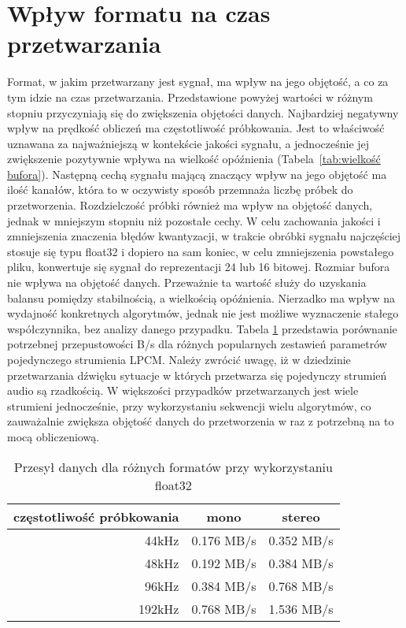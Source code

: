 \section{Wpływ formatu na czas przetwarzania}
Format, w jakim przetwarzany jest sygnał, ma wpływ na jego objętość, a co za tym idzie na czas przetwarzania. Przedstawione powyżej wartości w różnym stopniu przyczyniają się do zwiększenia objętości danych. Najbardziej negatywny wpływ na prędkość obliczeń ma częstotliwość próbkowania. Jest to właściwość uznawana za najważniejszą w kontekście jakości sygnału, a jednocześnie jej zwiększenie pozytywnie wpływa na wielkość opóźnienia (Tabela~\ref{tab:wielkość bufora}). Następną cechą sygnału mającą znaczący wpływ na jego objętość ma ilość kanałów, która to w oczywisty sposób przemnaża liczbę próbek do przetworzenia. Rozdzielczość próbki również ma wpływ na objętość danych, jednak w mniejszym stopniu niż pozostałe cechy. W celu zachowania jakości i zmniejszenia znaczenia błędów kwantyzacji, w trakcie obróbki sygnału najczęściej stosuje się typu float32 i dopiero na sam koniec, w celu zmniejszenia powstałego pliku, konwertuje się sygnał do reprezentacji 24 lub 16 bitowej. Rozmiar bufora nie wpływa na objętość danych. Przeważnie ta wartość służy do uzyskania balansu pomiędzy stabilnością, a wielkością opóźnienia. Nierzadko ma wpływ na wydajność konkretnych algorytmów, jednak nie jest możliwe wyznaczenie stałego współczynnika, bez analizy danego przypadku. Tabela \ref{tab:Przesył danych dla różnych formatów przy wykorzystaniu float32} przedstawia porównanie potrzebnej przepustowości B/s dla różnych popularnych zestawień parametrów pojedynczego strumienia LPCM. Należy zwrócić uwagę, iż w dziedzinie przetwarzania dźwięku sytuacje w których przetwarza się pojedynczy strumień audio są rzadkością. W większości przypadków przetwarzanych jest wiele strumieni jednocześnie, przy wykorzystaniu sekwencji wielu algorytmów, co zauważalnie zwiększa objętość danych do przetworzenia w raz z potrzebną na to mocą obliczeniową. 

\begin{table}[H]
    \begin{center}
        \caption{Przesył danych dla różnych formatów przy wykorzystaniu float32}
        \label{tab:Przesył danych dla różnych formatów przy wykorzystaniu float32}
        \begin{tabular}{r|c|c}
            częstotliwość próbkowania  &   mono      &   stereo \\
            \hline
            44kHz                      &   0.176 MB/s &  0.352 MB/s  \\
            48kHz                      &   0.192 MB/s &  0.384 MB/s  \\
            96kHz                      &   0.384 MB/s &  0.768 MB/s  \\
            192kHz                     &   0.768 MB/s & 1.536 MB/s  \\
        \end{tabular}
    \end{center}
\end{table}

